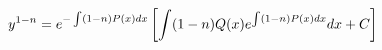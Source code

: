 \documentclass[preview]{standalone}
\begin{document}
\begin{align*}
\special{dvisvgm:raw <g id='unique000'>}y^{1-n} = e^{-\int (1-n)P(x)dx} \left[ \int (1-n)Q(x)e^{\int (1-n)P(x)dx}dx + C \right]\special{dvisvgm:raw </g>}
\end{align*}
\end{document}
